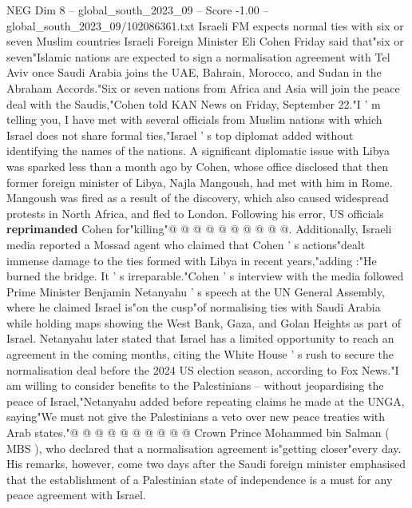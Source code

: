 \begin{textsample}{NEG Dim 8 – global\_south\_2023\_09 – Score -1.00 – global\_south\_2023\_09/102086361.txt}  \label{ex:f8_neg_003}
Israeli FM expects normal ties with six or seven Muslim countries Israeli Foreign Minister Eli Cohen Friday said that"six or seven"Islamic nations are expected to sign a normalisation agreement with Tel Aviv once Saudi Arabia joins the UAE, Bahrain, Morocco, and Sudan in the Abraham Accords."Six or seven nations from Africa and Asia will join the peace deal with the Saudis,"Cohen told KAN News on Friday, September 22."I ' m telling you, I have met with several officials from Muslim nations with which Israel does not share formal ties,"Israel ' s top diplomat added without identifying the names of the nations.
A significant diplomatic issue with Libya was sparked less than a month ago by Cohen, whose office disclosed that then former foreign minister of Libya, Najla Mangoush, had met with him in Rome.
Mangoush was fired as a result of the discovery, which also caused widespread protests in North Africa, and fled to London.
Following his error, US officials \textbf{reprimanded} Cohen for"killing"@ @ @ @ @ @ @ @ @ @.
Additionally, Israeli media reported a Mossad agent who claimed that Cohen ' s actions"dealt immense damage to the ties formed with Libya in recent years,"adding :"He burned the bridge.
It ' s irreparable."Cohen ' s interview with the media followed Prime Minister Benjamin Netanyahu ' s speech at the UN General Assembly, where he claimed Israel is"on the cusp"of normalising ties with Saudi Arabia while holding maps showing the West Bank, Gaza, and Golan Heights as part of Israel.
Netanyahu later stated that Israel has a limited opportunity to reach an agreement in the coming months, citing the White House ' s rush to secure the normalisation deal before the 2024 US election season, according to Fox News."I am willing to consider benefits to the Palestinians -- without jeopardising the peace of Israel,"Netanyahu added before repeating claims he made at the UNGA, saying"We must not give the Palestinians a veto over new peace treaties with Arab states."@ @ @ @ @ @ @ @ @ @ Crown Prince Mohammed bin Salman ( MBS ), who declared that a normalisation agreement is"getting closer"every day.
His remarks, however, come two days after the Saudi foreign minister emphasised that the establishment of a Palestinian state of independence is a must for any peace agreement with Israel.

\end{textsample}
